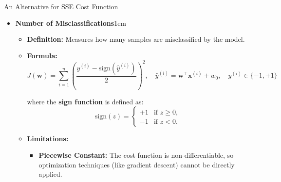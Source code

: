 \documentclass[serif, aspectratio=169]{beamer}
\begin{document}
    \begin{frame}{An Alternative for SSE Cost Function}
        \begin{itemize}
            \item \textbf{Number of Misclassifications}\itemsep1em
            \medskip
            \begin{itemize}\itemsep0.8em
            \item \textbf{Definition:}
            Measures how many samples are misclassified by the model.

            \item \textbf{Formula:}
            \[
                J(\mathbf{w}) = \sum_{i=1}^{n} \left( \frac{y^{(i)} - \text{sign}(\hat{y}^{(i)})}{2} \right)^2, \quad
                \hat{y}^{(i)} = \mathbf{w}^\top \mathbf{x}^{(i)} + w_0, \quad y^{(i)} \in \{-1, +1\}
            \]

            where the \textbf{sign function} is defined as:
            \[
                \text{sign}(z) =
                \begin{cases}
                    +1 & \text{if } z \ge 0, \\
                    -1 & \text{if } z < 0.
                \end{cases}
            \]

            \item \textbf{Limitations:}
            \begin{itemize}
                \item \justifying \textbf{Piecewise Constant:}
                The cost function is non-differentiable, so optimization techniques (like gradient descent) cannot be directly applied.
            \end{itemize}

            \end{itemize}
        \end{itemize}

        \vfill
    \end{frame}
\end{document}
